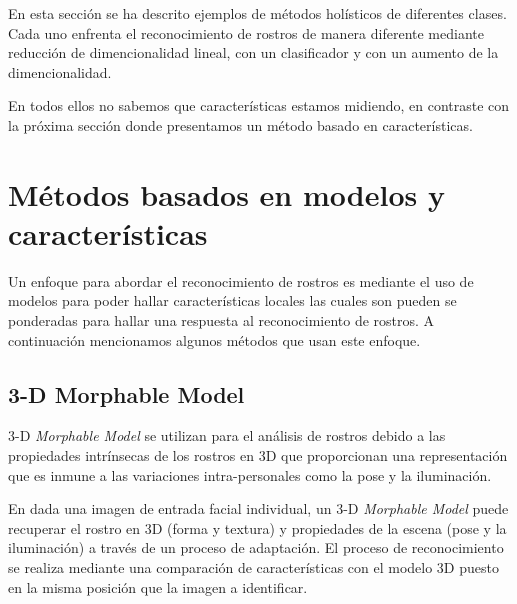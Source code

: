 
En esta sección se ha descrito ejemplos de métodos holísticos de diferentes clases. Cada uno enfrenta el reconocimiento de rostros de manera diferente mediante reducción de dimencionalidad lineal, con un clasificador y con un aumento de la dimencionalidad. 

En todos ellos no sabemos que características estamos midiendo, en contraste con la  próxima sección donde presentamos un método basado en características.

\section{Métodos basados en modelos y características}
Un enfoque para abordar el reconocimiento de rostros es mediante el uso de modelos para poder hallar características locales las cuales son pueden se ponderadas para hallar una respuesta al reconocimiento de rostros. A continuación mencionamos algunos métodos que usan este enfoque.

\subsection{3-D Morphable Model}
3-D \textit{Morphable Model} se utilizan para el análisis de rostros debido a las propiedades intrínsecas de los rostros en 3D que proporcionan una representación que es inmune a las variaciones intra-personales como la pose y la iluminación. 

En \cite{huang2003component} dada una imagen de entrada facial individual, un 3-D \textit{Morphable Model} puede recuperar el rostro en 3D (forma y textura) y propiedades de la escena (pose y la iluminación) a través de un proceso de adaptación. El proceso de reconocimiento se realiza mediante una comparación de características con el modelo 3D puesto en la misma posición que la imagen a identificar.



